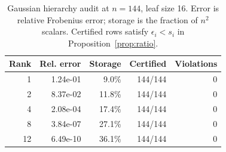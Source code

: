 \begin{table}[t]
\caption{\label{tab:operator}Gaussian hierarchy audit at $n=144$, leaf size 16. Error is relative Frobenius error; storage is the fraction of $n^2$ scalars. Certified rows satisfy $\epsilon_i<s_i$ in Proposition~\ref{prop:ratio}.}
\centering\small
\begin{tabular}{rrrrr}
\toprule
Rank & Rel. error & Storage & Certified & Violations\\
\midrule
1 & 1.24e-01 & 9.0\% & 144/144 & 0\\
2 & 8.37e-02 & 11.8\% & 144/144 & 0\\
4 & 2.08e-04 & 17.4\% & 144/144 & 0\\
8 & 3.84e-07 & 27.1\% & 144/144 & 0\\
12 & 6.49e-10 & 36.1\% & 144/144 & 0\\
\bottomrule
\end{tabular}
\end{table}
